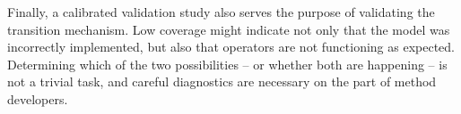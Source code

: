 \documentclass[oneside]{article}
\begin{document}
Finally, a calibrated validation study also serves the purpose of
validating the transition mechanism.
Low coverage might indicate not only that the model was incorrectly
implemented, but also that operators are not functioning as expected.
Determining which of the two possibilities -- or whether both are
happening -- is not a trivial task, and careful diagnostics are
necessary on the part of method developers.







\end{document}
